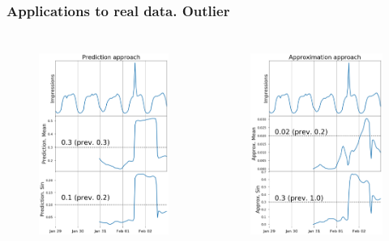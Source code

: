 \documentclass[intlimits, 9pt, unicode]{beamer}
\begin{document}
\begin{frame}
    \frametitle{Applications to real data. Outlier}
  \begin{columns}[T,onlytextwidth]
	\begin{figure}
	\includegraphics[height=6.5cm]{images/methods_comparison_2_1}
	\end{figure}
	
	\begin{figure}
	\includegraphics[height=6.5cm]{images/methods_comparison_2_2}
	\end{figure}
	
     \end{columns}

\end{frame}
\end{document}
